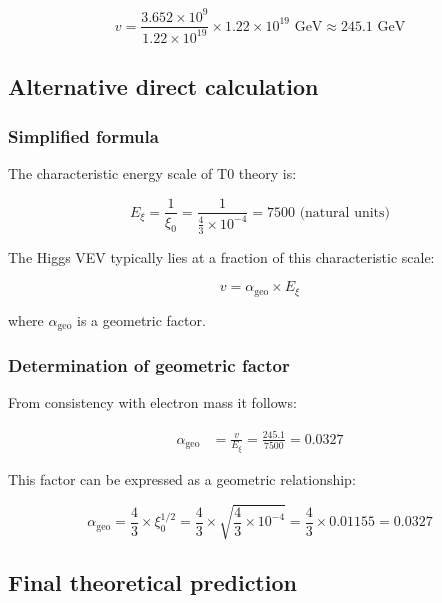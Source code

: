 \begin{equation}
	v = \frac{3.652 \times 10^9}{1.22 \times 10^{19}} \times 1.22 \times 10^{19} \text{ GeV} \approx 245.1 \text{ GeV}
\end{equation}

\subsection{Alternative direct calculation}

\subsubsection{Simplified formula}

The characteristic energy scale of T0 theory is:

\begin{equation}
	E_\xi = \frac{1}{\xi_0} = \frac{1}{\frac{4}{3} \times 10^{-4}} = 7500 \text{ (natural units)}
\end{equation}

The Higgs VEV typically lies at a fraction of this characteristic scale:

\begin{equation}
	v = \alpha_{\text{geo}} \times E_\xi
\end{equation}

where $\alpha_{\text{geo}}$ is a geometric factor.

\subsubsection{Determination of geometric factor}

From consistency with electron mass it follows:

\begin{align}
	\alpha_{\text{geo}} &= \frac{v}{E_\xi} = \frac{245.1}{7500} = 0.0327
\end{align}

This factor can be expressed as a geometric relationship:

\begin{equation}
	\alpha_{\text{geo}} = \frac{4}{3} \times \xi_0^{1/2} = \frac{4}{3} \times \sqrt{\frac{4}{3} \times 10^{-4}} = \frac{4}{3} \times 0.01155 = 0.0327
\end{equation}

\subsection{Final theoretical prediction}


